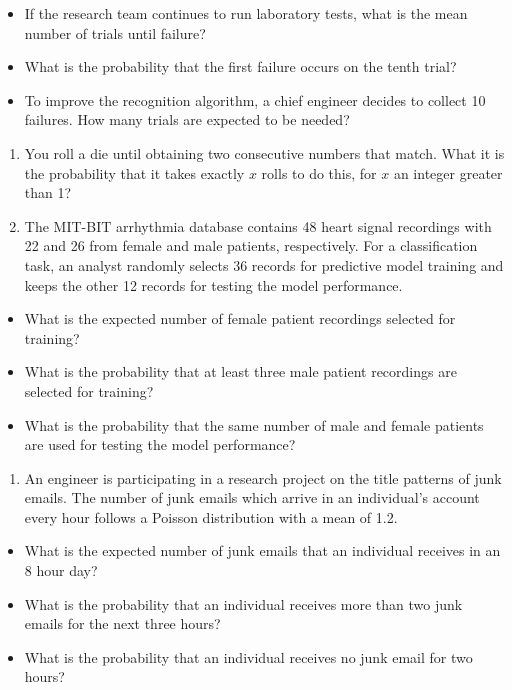 \documentclass[
]{article}
\providecommand{\tightlist}{%
  \setlength{\itemsep}{0pt}\setlength{\parskip}{0pt}}
\begin{document}
\begin{itemize}
\item
  If the research team continues to run laboratory tests, what is the
  mean number of trials until failure?
\item
  What is the probability that the first failure occurs on the tenth
  trial?
\item
  To improve the recognition algorithm, a chief engineer decides to
  collect 10 failures. How many trials are expected to be needed?
\end{itemize}

\begin{enumerate}
\def\labelenumi{\arabic{enumi}.}
\setcounter{enumi}{3}
\item
  You roll a die until obtaining two consecutive numbers that match.
  What it is the probability that it takes exactly \(x\) rolls to do
  this, for \(x\) an integer greater than 1?
\item
  The MIT-BIT arrhythmia database contains 48 heart signal recordings
  with 22 and 26 from female and male patients, respectively. For a
  classification task, an analyst randomly selects 36 records for
  predictive model training and keeps the other 12 records for testing
  the model performance.
\end{enumerate}

\begin{itemize}
\item
  What is the expected number of female patient recordings selected for
  training?
\item
  What is the probability that at least three male patient recordings
  are selected for training?
\item
  What is the probability that the same number of male and female
  patients are used for testing the model performance?
\end{itemize}

\begin{enumerate}
\def\labelenumi{\arabic{enumi}.}
\setcounter{enumi}{5}
\tightlist
\item
  An engineer is participating in a research project on the title
  patterns of junk emails. The number of junk emails which arrive in an
  individual's account every hour follows a Poisson distribution with a
  mean of 1.2.
\end{enumerate}

\begin{itemize}
\item
  What is the expected number of junk emails that an individual receives
  in an 8 hour day?
\item
  What is the probability that an individual receives more than two junk
  emails for the next three hours?
\item
  What is the probability that an individual receives no junk email for
  two hours?
\end{itemize}
\end{document}
